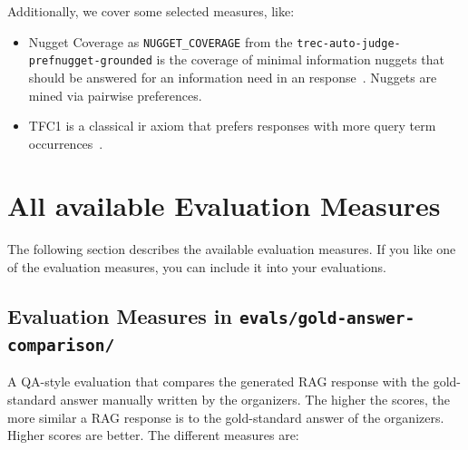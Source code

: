 \documentclass[]{ceurart}
\begin{document}
Additionally, we cover some selected measures, like:

\begin{itemize}
\item
Nugget Coverage as \texttt{NUGGET\_COVERAGE} from the \texttt{trec-auto-judge-prefnugget-grounded} is the coverage of minimal information nuggets that should be answered for an information need in an response~\cite{dietz:2026,farzi:2026}. Nuggets are mined via pairwise preferences.

\item
TFC1 is a classical ir axiom that prefers responses with more query term occurrences~\cite{merker:2025,farzi:2026}.
\end{itemize}

\section{All available Evaluation Measures}

The following section describes the available evaluation measures. If you like one of the evaluation measures, you can include it into your evaluations.

\subsection{Evaluation Measures in \texttt{evals/gold-answer-comparison/}}

A QA-style evaluation that compares the generated RAG response with the gold-standard answer manually written by the organizers. The higher the scores, the more similar a RAG response is to the gold-standard answer of the organizers. Higher scores are better. The different measures are:
\end{document}
